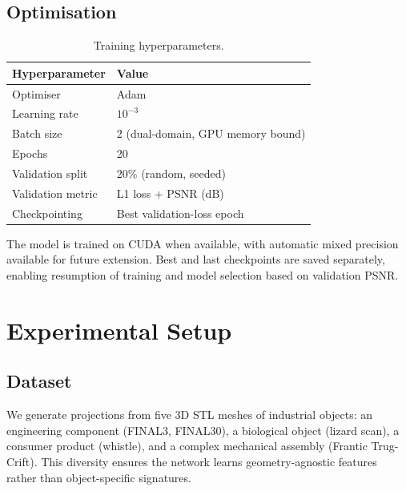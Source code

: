 \documentclass[10pt,twocolumn]{article}
\begin{document}
\subsection{Optimisation}

\begin{table}[H]
    \centering
    \caption{Training hyperparameters.}
    \label{tab:hyper}
    \begin{tabular}{ll}
        \toprule
        \textbf{Hyperparameter} & \textbf{Value} \\
        \midrule
        Optimiser            & Adam \\
        Learning rate        & $10^{-3}$ \\
        Batch size           & 2 (dual-domain, GPU memory bound) \\
        Epochs               & 20 \\
        Validation split     & 20\% (random, seeded) \\
        Validation metric    & L1 loss + PSNR (dB) \\
        Checkpointing        & Best validation-loss epoch \\
        \bottomrule
    \end{tabular}
\end{table}

The model is trained on CUDA when available, with automatic
mixed precision available for future extension.
Best and last checkpoints are saved separately, enabling
resumption of training and model selection based on validation PSNR.

\section{Experimental Setup}
\label{sec:experiments}

\subsection{Dataset}

We generate projections from five 3D STL meshes of industrial objects:
an engineering component (FINAL3, FINAL30), a biological object
(lizard scan), a consumer product (whistle), and a complex mechanical
assembly (Frantic Trug-Crift).
This diversity ensures the network learns geometry-agnostic
features rather than object-specific signatures.
\end{document}
